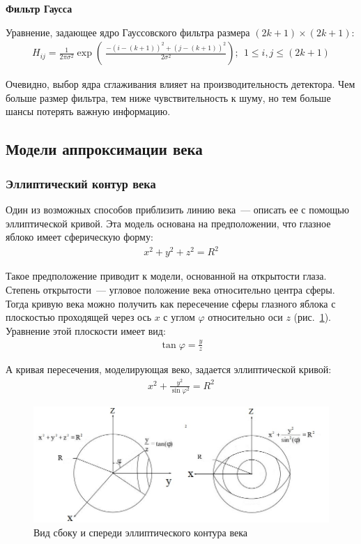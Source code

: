 \documentclass[12pt]{article} %
\begin{document}
\textbf{Фильтр Гаусса}

Уравнение, задающее ядро Гауссовского фильтра размера $(2k+1)\times (2k+1)$:
\begin{gather}\label{norm}
	H_{ij}=\frac{1}{2\pi \sigma^2}\exp{\left(\ \frac {-(i-(k+1))^2+(j-(k+1))^2}{2\sigma^2}\right)};~~1\leq i, j \leq(2k+1)
\end{gather}

Очевидно, выбор ядра сглаживания влияет на производительность детектора. Чем больше размер фильтра, тем ниже чувствительность к шуму, но тем больше шансы потерять важную информацию.

\newpage

\subsection{Модели аппроксимации века}

\subsubsection{Эллиптический контур века}

Один из возможных способов приблизить линию века~--- описать ее с помощью эллиптической кривой. Эта модель основана на предположении, что глазное яблоко имеет сферическую форму:
\begin{gather}\label{norm}
	x^2+y^2+z^2= R^2
\end{gather}

Такое предположение приводит к модели, основанной на открытости глаза. Степень открытости~--- угловое положение века относительно центра сферы. Тогда кривую века можно получить как пересечение сферы глазного яблока с плоскостью проходящей через ось $x$ с углом $\varphi$ относительно оси $z$ (рис.~\ref{fig:glaz4}). Уравнение этой плоскости имеет вид:
\begin{gather}\label{el1}
	\tan{\varphi}= \frac{y}{z}
\end{gather}

А кривая пересечения, моделирующая веко, задается эллиптической кривой:
\begin{gather}\label{el2}
	x^2+\frac{y^2}{\sin{\varphi}^2}=R^2
\end{gather}

\begin{figure}[h]
	
	\centering
	
	\includegraphics[width=0.8\linewidth]{glaz4.jpg}
	
	\caption{Вид сбоку и спереди эллиптического контура века}
	
	\label{fig:glaz4}
	
\end{figure}
\end{document}
